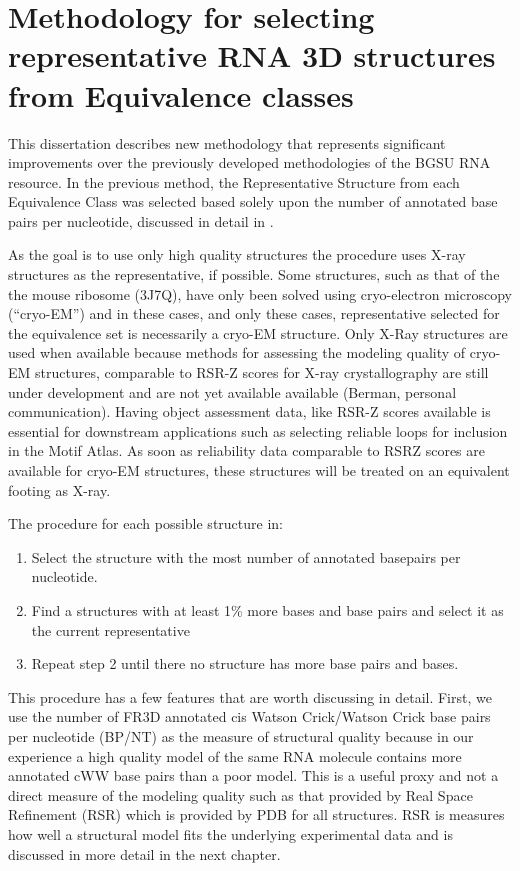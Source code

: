 \section{Methodology for selecting representative RNA 3D structures from
Equivalence classes}

This dissertation describes new methodology that represents significant
improvements over the previously developed methodologies of the BGSU RNA
resource. In the previous method, the Representative Structure from each
Equivalence Class was selected based solely upon the number of annotated base
pairs per nucleotide, discussed in detail in \cite{Leontis2012b}.

As the goal is to use only high quality structures the procedure uses X-ray
structures as the representative, if possible. Some structures, such as that of
the the mouse ribosome (3J7Q), have only been solved using cryo-electron
microscopy (``cryo-EM'') and in these cases, and only these cases,
representative selected for the equivalence set is necessarily a cryo-EM
structure. Only X-Ray structures are used when available because methods for
assessing the modeling quality of cryo-EM structures, comparable to RSR-Z scores
for X-ray crystallography are still under development and are not yet available
available (Berman, personal communication). Having object assessment data, like
RSR-Z scores available is essential for downstream applications such as
selecting reliable loops for inclusion in the Motif Atlas. As soon as
reliability data comparable to RSRZ scores are available for cryo-EM structures,
these structures will be treated on an equivalent footing as X-ray.

The procedure for each possible structure in:

\begin{enumerate}
  \item Select the structure with the most number of annotated basepairs per
    nucleotide.

  \item Find a structures with at least 1\% more bases and base pairs and select
    it as the current representative

  \item Repeat step 2 until there no structure has more base pairs and bases.
\end{enumerate}

This procedure has a few features that are worth discussing in detail. First, we
use the number of FR3D annotated cis Watson Crick/Watson Crick base pairs per
nucleotide (BP/NT) as the measure of structural quality because in our
experience a high quality model of the same RNA molecule contains more annotated
cWW base pairs than a poor model. This is a useful proxy and not a direct
measure of the modeling quality such as that provided by Real Space Refinement
(RSR) which is provided by PDB for all structures. RSR is measures how well a
structural model fits the underlying experimental data and is discussed in more
detail in the next chapter.

